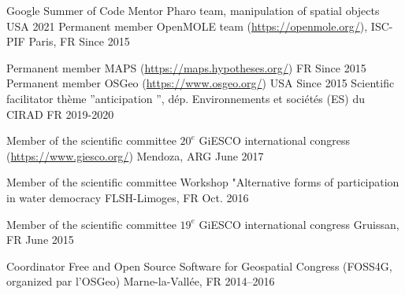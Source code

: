 

\begin{cvhonors}

  \cvhonor
    {Google Summer of Code Mentor} %
    {Pharo team, manipulation of spatial objects} %
    {USA} %
    {2021} %
    \cvhonor
      {Permanent member} %
      {OpenMOLE team (\url{https://openmole.org/}), ISC-PIF} %
      {Paris, FR} %
      {Since 2015} %

    \cvhonor
      {Permanent member} %
      {MAPS (\url{https://maps.hypotheses.org/})} %
      {FR} %
      {Since 2015} %
    \cvhonor
      {Permanent member} %
      {OSGeo (\url{https://www.osgeo.org/})} %
      {USA} %
      {Since 2015} %
  \cvhonor
    {Scientific facilitator} %
    {thème ”anticipation ”, dép. Environnements et sociétés (ES) du CIRAD} %
    {FR} %
    {2019-2020} %

  \cvhonor
    {Member of the scientific committee} %
    {$20^{e}$ GiESCO international congress (\url{https://www.giesco.org/})} %
    {Mendoza, ARG} %
    {June 2017} %

  \cvhonor
    {Member of the scientific committee} %
    {Workshop "Alternative forms of participation in water democracy} %
    {FLSH-Limoges, FR} %
    {Oct. 2016} %

  \cvhonor
    {Member of the scientific committee} %
    {$19^{e}$ GiESCO international congress} %
    {Gruissan, FR} %
    {June 2015} %

\cvhonor
  {Coordinator} %
  {Free and Open Source Software for Geospatial Congress (FOSS4G, organized par l'OSGeo)} %
  {Marne-la-Vallée, FR} %
  {2014--2016} %

\end{cvhonors}
